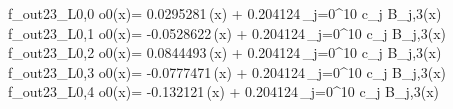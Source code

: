 f_{out23_L0,0	o0}(x)= 0.0295281\,\phi(x) + 0.204124\,\sum_{j=0}^{10} c_j B_{j,3}(x)
f_{out23_L0,1	o0}(x)= -0.0528622\,\phi(x) + 0.204124\,\sum_{j=0}^{10} c_j B_{j,3}(x)
f_{out23_L0,2	o0}(x)= 0.0844493\,\phi(x) + 0.204124\,\sum_{j=0}^{10} c_j B_{j,3}(x)
f_{out23_L0,3	o0}(x)= -0.0777471\,\phi(x) + 0.204124\,\sum_{j=0}^{10} c_j B_{j,3}(x)
f_{out23_L0,4	o0}(x)= -0.132121\,\phi(x) + 0.204124\,\sum_{j=0}^{10} c_j B_{j,3}(x)
